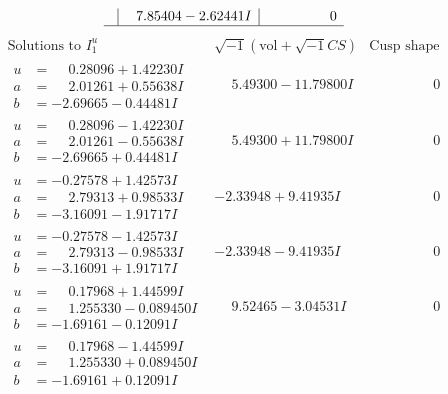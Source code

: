 \documentclass[1p]{elsarticle_modified}
\theoremstyle{definition}
\newcommand{\I}{\sqrt{-1}}
\begin{document}
$$\begin{array}{c|c|c}
 & \phantom{-}7.85404 - 2.62441 I & \phantom{-0.000000 } 0\\
 \hline 
 \end{array}$$\newpage$$\begin{array}{c|c|c}  
\text{Solutions to }I^u_{1}& \I (\text{vol} + \sqrt{-1}CS) & \text{Cusp shape}\\
 \hline 
\begin{aligned}
u &= \phantom{-}0.28096 + 1.42230 I \\
a &= \phantom{-}2.01261 + 0.55638 I \\
b &= -2.69665 - 0.44481 I\end{aligned}
 & \phantom{-}5.49300 - 11.79800 I & \phantom{-0.000000 } 0 \\ \hline\begin{aligned}
u &= \phantom{-}0.28096 - 1.42230 I \\
a &= \phantom{-}2.01261 - 0.55638 I \\
b &= -2.69665 + 0.44481 I\end{aligned}
 & \phantom{-}5.49300 + 11.79800 I & \phantom{-0.000000 } 0 \\ \hline\begin{aligned}
u &= -0.27578 + 1.42573 I \\
a &= \phantom{-}2.79313 + 0.98533 I \\
b &= -3.16091 - 1.91717 I\end{aligned}
 & -2.33948 + 9.41935 I & \phantom{-0.000000 } 0 \\ \hline\begin{aligned}
u &= -0.27578 - 1.42573 I \\
a &= \phantom{-}2.79313 - 0.98533 I \\
b &= -3.16091 + 1.91717 I\end{aligned}
 & -2.33948 - 9.41935 I & \phantom{-0.000000 } 0 \\ \hline\begin{aligned}
u &= \phantom{-}0.17968 + 1.44599 I \\
a &= \phantom{-}1.255330 - 0.089450 I \\
b &= -1.69161 - 0.12091 I\end{aligned}
 & \phantom{-}9.52465 - 3.04531 I & \phantom{-0.000000 } 0 \\ \hline\begin{aligned}
u &= \phantom{-}0.17968 - 1.44599 I \\
a &= \phantom{-}1.255330 + 0.089450 I \\
b &= -1.69161 + 0.12091 I\end{aligned}

\end{array}$$
\end{document}
